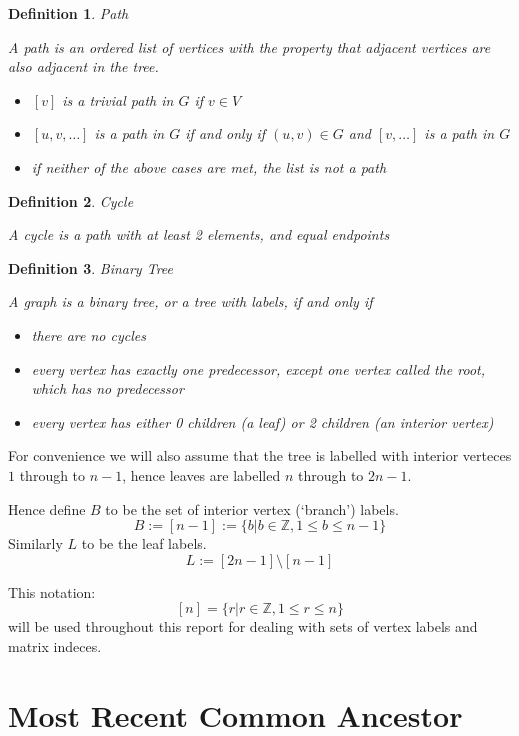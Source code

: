 \documentclass[10pt,a4paper]{report}
\newcommand{\Z}{\mathbb{Z}}
\newtheorem{definition}{Definition}
\begin{document}
\begin{definition} Path

	A path is an ordered list of vertices with the property that adjacent
	vertices are also adjacent in the tree.

	\begin{itemize}
		\item $[v]$ is a trivial path in $G$ if $v \in V$
		\item $[u, v, \ldots]$ is a path in $G$ if and only if $(u, v) \in G$
			and $[v, \ldots]$ is a path in $G$
		\item if neither of the above cases are met, the list is not a path
	\end{itemize}
\end{definition}

\begin{definition} Cycle

	A cycle is a path with at least 2 elements, and equal endpoints
\end{definition}

\begin{definition} Binary Tree

	A graph is a binary tree, or a tree with labels, if and only if
	\begin{itemize}
		\item there are no cycles
		\item every vertex has exactly one predecessor, except one vertex called
			the root, which has no predecessor
		\item every vertex has either 0 children (a leaf) or 2 children
			(an interior vertex)
	\end{itemize}
\end{definition}

For convenience we will also assume that the tree is labelled with interior verteces $1$
through to $n-1$, hence leaves are labelled $n$ through to $2n-1$.

Hence define $B$ to be the set of interior vertex (`branch') labels.
\[B := [n-1] := \{b | b \in \Z, 1 \leq b \leq n-1\}\]
Similarly $L$ to be the leaf labels.
\[L := [2n-1] \setminus [n-1]\]

This notation: \[[n] = \{r|r\in\Z, 1 \leq r \leq n\}\] will be used throughout this report for dealing with sets of vertex labels and matrix indeces.

\section{Most Recent Common Ancestor}
\end{document}
